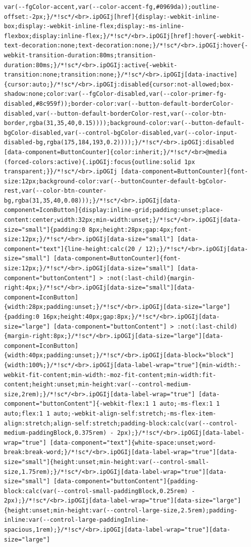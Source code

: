\documentclass[
  letterpaper,
]{book}
\begin{document}
\begin{verbatim}
var(--fgColor-accent,var(--color-accent-fg,#0969da));outline-offset:-2px;}/*!sc*/<br>.ipOGIj[href]{display:-webkit-inline-box;display:-webkit-inline-flex;display:-ms-inline-flexbox;display:inline-flex;}/*!sc*/<br>.ipOGIj[href]:hover{-webkit-text-decoration:none;text-decoration:none;}/*!sc*/<br>.ipOGIj:hover{-webkit-transition-duration:80ms;transition-duration:80ms;}/*!sc*/<br>.ipOGIj:active{-webkit-transition:none;transition:none;}/*!sc*/<br>.ipOGIj[data-inactive]{cursor:auto;}/*!sc*/<br>.ipOGIj:disabled{cursor:not-allowed;box-shadow:none;color:var(--fgColor-disabled,var(--color-primer-fg-disabled,#8c959f));border-color:var(--button-default-borderColor-disabled,var(--button-default-borderColor-rest,var(--color-btn-border,rgba(31,35,40,0.15))));background-color:var(--button-default-bgColor-disabled,var(--control-bgColor-disabled,var(--color-input-disabled-bg,rgba(175,184,193,0.2))));}/*!sc*/<br>.ipOGIj:disabled [data-component=ButtonCounter]{color:inherit;}/*!sc*/<br>@media (forced-colors:active){.ipOGIj:focus{outline:solid 1px transparent;}}/*!sc*/<br>.ipOGIj [data-component=ButtonCounter]{font-size:12px;background-color:var(--buttonCounter-default-bgColor-rest,var(--color-btn-counter-bg,rgba(31,35,40,0.08)));}/*!sc*/<br>.ipOGIj[data-component=IconButton]{display:inline-grid;padding:unset;place-content:center;width:32px;min-width:unset;}/*!sc*/<br>.ipOGIj[data-size="small"]{padding:0 8px;height:28px;gap:4px;font-size:12px;}/*!sc*/<br>.ipOGIj[data-size="small"] [data-component="text"]{line-height:calc(20 / 12);}/*!sc*/<br>.ipOGIj[data-size="small"] [data-component=ButtonCounter]{font-size:12px;}/*!sc*/<br>.ipOGIj[data-size="small"] [data-component="buttonContent"] > :not(:last-child){margin-right:4px;}/*!sc*/<br>.ipOGIj[data-size="small"][data-component=IconButton]{width:28px;padding:unset;}/*!sc*/<br>.ipOGIj[data-size="large"]{padding:0 16px;height:40px;gap:8px;}/*!sc*/<br>.ipOGIj[data-size="large"] [data-component="buttonContent"] > :not(:last-child){margin-right:8px;}/*!sc*/<br>.ipOGIj[data-size="large"][data-component=IconButton]{width:40px;padding:unset;}/*!sc*/<br>.ipOGIj[data-block="block"]{width:100%;}/*!sc*/<br>.ipOGIj[data-label-wrap="true"]{min-width:-webkit-fit-content;min-width:-moz-fit-content;min-width:fit-content;height:unset;min-height:var(--control-medium-size,2rem);}/*!sc*/<br>.ipOGIj[data-label-wrap="true"] [data-component="buttonContent"]{-webkit-flex:1 1 auto;-ms-flex:1 1 auto;flex:1 1 auto;-webkit-align-self:stretch;-ms-flex-item-align:stretch;align-self:stretch;padding-block:calc(var(--control-medium-paddingBlock,0.375rem) - 2px);}/*!sc*/<br>.ipOGIj[data-label-wrap="true"] [data-component="text"]{white-space:unset;word-break:break-word;}/*!sc*/<br>.ipOGIj[data-label-wrap="true"][data-size="small"]{height:unset;min-height:var(--control-small-size,1.75rem);}/*!sc*/<br>.ipOGIj[data-label-wrap="true"][data-size="small"] [data-component="buttonContent"]{padding-block:calc(var(--control-small-paddingBlock,0.25rem) - 2px);}/*!sc*/<br>.ipOGIj[data-label-wrap="true"][data-size="large"]{height:unset;min-height:var(--control-large-size,2.5rem);padding-inline:var(--control-large-paddingInline-spacious,1rem);}/*!sc*/<br>.ipOGIj[data-label-wrap="true"][data-size="large"] 
\end{verbatim}
\end{document}
